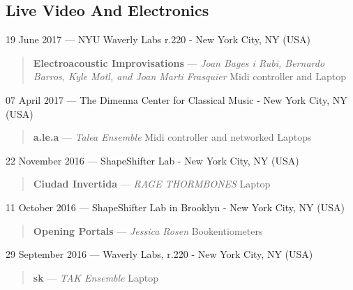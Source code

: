 \documentclass[12pt,overlapped]{res}%
\begin{document}
\begin{resume}
\subsection{Live Video And Electronics}%
19 June 2017 --- NYU Waverly Labs r.220 - New York City, NY (USA)%
\begin{quote}
\par
\textbf{Electroacoustic Improvisations}  --- \textit{Joan Bages i Rubi, Bernardo Barros, Kyle Motl, and Joan Marti Frasquier}
Midi controller and Laptop
\end{quote}%
%
%
%
07 April 2017 --- The Dimenna Center for Classical Music - New York City, NY (USA)%
\begin{quote}
\par
\textbf{a.le.a} --- \textit{Talea Ensemble}
Midi controller and networked Laptops
\end{quote}%
%
%
%
22 November 2016 --- ShapeShifter Lab - New York City, NY (USA)%
\begin{quote}
\par
\textbf{Ciudad Invertida} --- \textit{RAGE THORMBONES}
Laptop
\end{quote}%
%
%
%
11 October 2016 --- ShapeShifter Lab in Brooklyn - New York City, NY (USA)%
\begin{quote}
\par
\textbf{Opening Portals} --- \textit{Jessica Rosen}
Bookentiometers
\end{quote}%
%
%
%
29 September 2016 --- Waverly Labs, r.220 - New York City, NY (USA)%
\begin{quote}
\par
\textbf{sk} --- \textit{TAK Ensemble}
Laptop
\end{quote}%


\end{resume}
\end{document}
